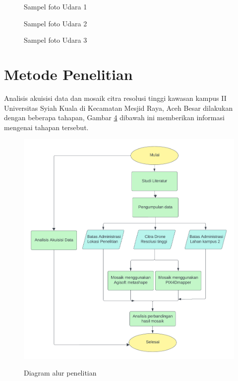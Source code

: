 \begin{figure}[H]
        \centering
	\caption{Sampel foto Udara 1}
	\label{Sampel foto Udara 1} %
\end{figure}
\begin{figure}[H]
        \centering
	\caption{Sampel foto Udara 2}
	\label{Sampel foto Udara 2} %
\end{figure}
\begin{figure}[H]
        \centering
	\caption{Sampel foto Udara 3}
	\label{Sampel foto Udara 3} %
\end{figure}

\section{Metode Penelitian}

Analisis akuisisi data dan mosaik citra resolusi tinggi kawasan kampus II Universitas Syiah Kuala di Kecamatan Mesjid Raya, Aceh Besar dilakukan dengan beberapa tahapan, Gambar \ref{alur} dibawah ini memberikan informasi mengenai tahapan tersebut.

\begin{figure}[H]
	\centering
	{\includegraphics [width = 11.5cm,]{image/blank diagram.png}}
	\caption{Diagram alur penelitian}
	\label{alur} %
\end{figure}

